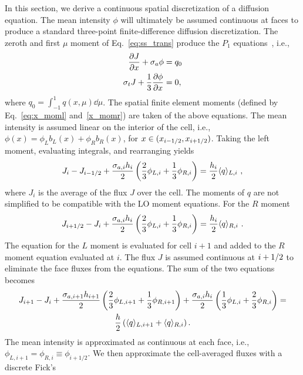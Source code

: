 In this section, we derive a continuous spatial discretization of a diffusion equation.  
The mean intensity $\phi$ will ultimately be assumed continuous at faces to produce a
standard three-point finite-difference diffusion discretization. 
The zeroth and first $\mu$ moment of Eq.~\eqref{eq:ss_trans} produce the $P_1$
equations~\cite{lewis,wla_thesis}, i.e., 
\begin{align}\label{eq:dsa_bal}
    \frac{\partial J}{\partial x} + \sigma_a \phi &= q_0 \\ \label{eq:p1}
    \sigma_t J + \frac{1}{3} \frac{\partial \phi}{\partial x} &= 0, \\
\end{align}
where $q_0=\int_{-1}^1 q(x,\mu) \dd \mu $.
The spatial finite element moments (defined by Eq.~\eqref{eq:x_moml} and~\eqref{x_momr})
are taken of the above equations. 
The mean intensity is assumed linear on the interior of the cell, i.e.,
$\phi(x)=\phi_Lb_L(x) + \phi_Rb_R(x)$, for $x\in({x_{i-1/2}},{x_{i+1/2}})$.   Taking the left moment,
evaluating integrals, and rearranging yields
\begin{equation}
    J_{i} - J_{{i-1/2}}  + \frac{\sigma_{a,i}h_i}{2} \left(\frac{2}{3} \phi_{L,i} + \frac{1}{3}
    \phi_{R,i} \right) = \frac{h_i}{2} \langle q \rangle_{L,i}\,\,,
\end{equation}
where $J_i$ is the average of the flux $J$ over the cell. The moments of $q$ are
not simplified to be compatible with the LO moment equations. For the $R$ moment
\begin{equation}
    J_{i+1/2} - J_{i}  + \frac{\sigma_{a,i}h_i}{2} \left(\frac{2}{3} \phi_{L,i} + \frac{1}{3}
    \phi_{R,i} \right) = \frac{h_i}{2} \langle q \rangle_{R,i}\,\,.
\end{equation}
The equation for the $L$ moment is evaluated for cell $i+1$ and added to the $R$ moment
equation evaluated at $i$.  The flux $J$ is assumed continuous at ${i+1/2}$ to eliminate
the face fluxes from the equations.  The sum of the two equations becomes
\begin{multline}\label{eq:diff_noclose}
    J_{i+1} - J_{i} + \frac{\sigma_{a,i+1} h_{i+1}}{2}\left(\frac{2}{3} \phi_{L,i+1} +
    \frac{1}{3}\phi_{R,i+1}\right) + \frac{\sigma_{a,i} h_i}{2} \left( \frac{1}{3} \phi_{L,i} +
    \frac{2}{3}\phi_{R,i}\right) =\\ \frac{h}{2} \left(\langle q \rangle_{L,i+1} + \langle q \rangle_{R,i}
    \right).
\end{multline}
The mean intensity is approximated as continuous at each face, i.e., $\phi_{L,i+1} = \phi_{R,i}
\equiv \phi_{i+1/2}$.  We then approximate the cell-averaged fluxes with a discrete Fick's
